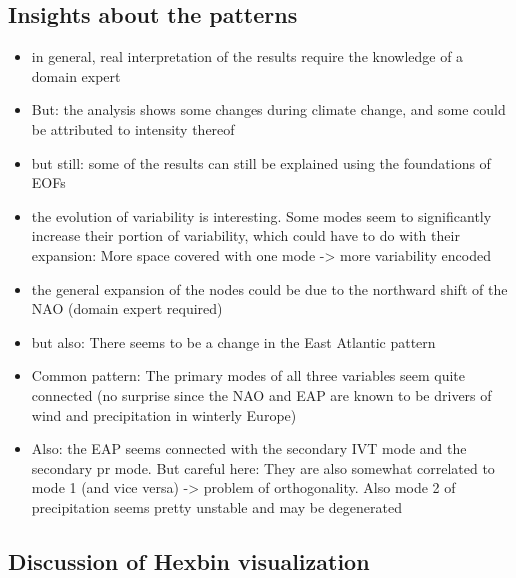 \subsection{Insights about the patterns}

\begin{itemize}
  \item in general, real interpretation of the results require the knowledge of a domain expert
  \item But: the analysis shows some changes during climate change, and some could be attributed to intensity thereof 
  \item but still: some of the results can still be explained using the foundations of EOFs 
  \item the evolution of variability is interesting. Some modes seem to significantly increase their portion of variability, which could have to do with their expansion: More space covered with one mode -> more variability encoded 
  \item the general expansion of the nodes could be due to the northward shift of the NAO (domain expert required)
  \item but also: There seems to be a change in the East Atlantic pattern  
  \item Common pattern: The primary modes of all three variables seem quite connected (no surprise since the NAO and EAP are known to be drivers of wind and precipitation in winterly Europe)
  \item Also: the EAP seems connected with the secondary IVT mode and the secondary pr mode. But careful here: They are also somewhat correlated to mode 1 (and vice versa) -> problem of orthogonality. Also mode 2 of precipitation seems pretty unstable and may be degenerated 
\end{itemize}

\subsection{Discussion of Hexbin visualization}


